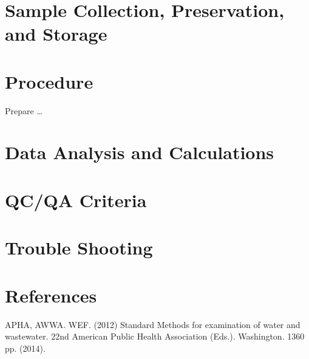 \documentclass[12pt]{../SOP3_beta}
\begin{document}
\section{Sample Collection, Preservation, and Storage}

\section{Procedure}

\NP Prepare \dots

\NP

\section{Data Analysis and Calculations}

\section{QC/QA Criteria}

\section{Trouble Shooting}

\section{References}

\NP APHA, AWWA. WEF. (2012) Standard Methods for examination of water and wastewater. 22nd American Public Health Association (Eds.). Washington. 1360 pp. (2014).
\end{document}
